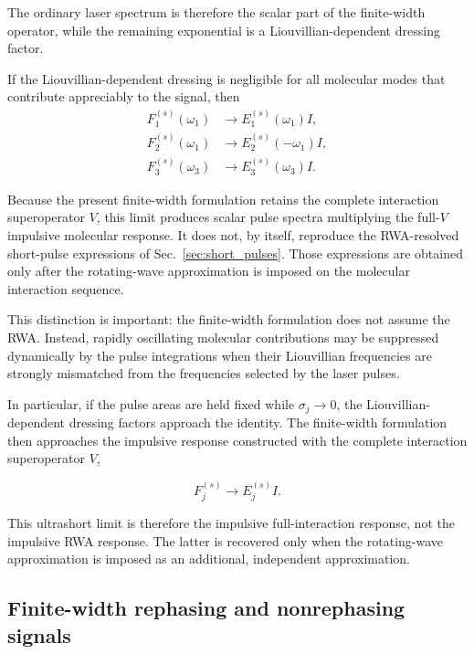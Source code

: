 \documentclass[11pt]{article}
\begin{document}
The ordinary laser spectrum is therefore the scalar part of the
finite-width operator, while the remaining exponential is a
Liouvillian-dependent dressing factor.

If the Liouvillian-dependent dressing is negligible for all molecular
modes that contribute appreciably to the signal, then
%
\begin{align}
F_1^{(s)}(\omega_1)
&\rightarrow
E_1^{(s)}(\omega_1)I,
\\
F_2^{(s)}(\omega_1)
&\rightarrow
E_2^{(s)}(-\omega_1)I,
\\
F_3^{(s)}(\omega_3)
&\rightarrow
E_3^{(s)}(\omega_3)I.
\end{align}

Because the present finite-width formulation retains the complete
interaction superoperator $V$, this limit produces scalar pulse spectra
multiplying the full-$V$ impulsive molecular response. It does not, by
itself, reproduce the RWA-resolved short-pulse expressions of
Sec.~\ref{sec:short_pulses}. Those expressions are obtained only after
the rotating-wave approximation is imposed on the molecular
interaction sequence.

This distinction is important: the finite-width formulation does not
assume the RWA. Instead, rapidly oscillating molecular contributions
may be suppressed dynamically by the pulse integrations when their
Liouvillian frequencies are strongly mismatched from the frequencies
selected by the laser pulses.

In particular, if the pulse areas are held fixed while
$\sigma_j\rightarrow0$, the Liouvillian-dependent dressing factors
approach the identity. The finite-width formulation then approaches the
impulsive response constructed with the complete interaction
superoperator $V$,

\begin{equation}
F_j^{(s)}
\longrightarrow
E_j^{(s)} I.
\end{equation}

This ultrashort limit is therefore the impulsive full-interaction
response, not the impulsive RWA response. The latter is recovered only
when the rotating-wave approximation is imposed as an additional,
independent approximation.


\subsection{Finite-width rephasing and nonrephasing signals}
\label{subsec:finite_rnr}
\end{document}
